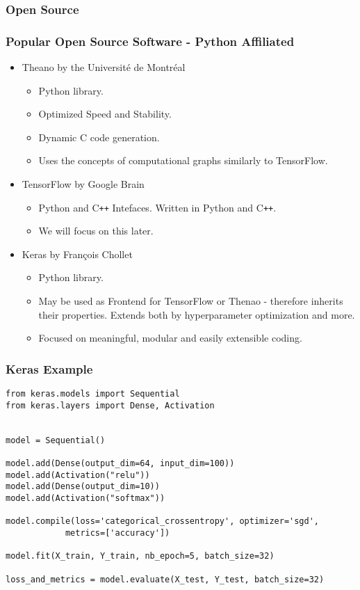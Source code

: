 \documentclass[9pt]{beamer}
\begin{document}
\subsubsection{Open Source}
\begin{frame}
\frametitle{Popular Open Source Software - Python Affiliated}
\begin{itemize}
\item Theano by the Université de Montréal
\begin{itemize}
\item Python library.
\item Optimized Speed and Stability.
\item Dynamic C code generation.
\item Uses the concepts of computational graphs similarly to TensorFlow.
\end{itemize}
\item TensorFlow by Google Brain
\begin{itemize}
\item Python and C\texttt{++} Intefaces. Written in Python and C\texttt{++}.
\item We will focus on this later.
\end{itemize}
\item Keras by François Chollet
\begin{itemize}
\item Python library.
\item May be used as Frontend for TensorFlow or Thenao - therefore inherits their properties. Extends both by hyperparameter optimization and more.
\item Focused on meaningful, modular and easily extensible coding.
\end{itemize}
\end{itemize}
\end{frame}

\begin{frame}[fragile]
\frametitle{Keras Example}
\small
\begin{verbatim}
from keras.models import Sequential
from keras.layers import Dense, Activation


model = Sequential()

model.add(Dense(output_dim=64, input_dim=100))
model.add(Activation("relu"))
model.add(Dense(output_dim=10))
model.add(Activation("softmax"))

model.compile(loss='categorical_crossentropy', optimizer='sgd',
  			metrics=['accuracy'])

model.fit(X_train, Y_train, nb_epoch=5, batch_size=32)

loss_and_metrics = model.evaluate(X_test, Y_test, batch_size=32)
\end{verbatim}
\end{frame}
\end{document}
